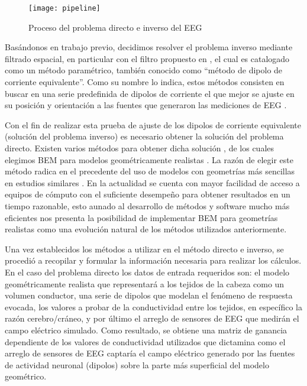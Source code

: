 \begin{figure}[tb]
	\centering
	\texttt{[image: pipeline]}
	\caption{Proceso del problema directo e inverso del EEG
		}
	\label{fig:methodology:pipeline}
\end{figure}

Basándonos en trabajo previo, decidimos resolver el problema inverso mediante filtrado espacial, en particular con el filtro propuesto en \cite{VanVeen1988}, el cual es catalogado como un método paramétrico, también conocido como ``método de dipolo de corriente equivalente''.
Como su nombre lo indica, estos métodos consisten en buscar en una serie predefinida de dipolos de corriente el que mejor se ajuste en su posición y orientación a las fuentes que generaron las mediciones de EEG  \cite{Hallez2007}.

Con el fin de realizar esta prueba de ajuste de los dipolos de corriente equivalente (solución del problema inverso) es necesario obtener la solución del problema directo. Existen varios métodos para obtener dicha solución \cite{Mosher1999}, de los cuales elegimos BEM para modelos geométricamente realistas \cite{Ermer2001}.
La razón de elegir este método radica en el precedente del uso de modelos con geometrías más sencillas en estudios similares \cite{Gutierrez2004}.
En la actualidad se cuenta con mayor facilidad de acceso a equipos de cómputo con el suficiente desempeño para obtener resultados en un tiempo razonable, esto aunado al desarrollo de métodos y software mucho más eficientes \cite{open,Clerc2010} nos presenta la posibilidad de implementar BEM para geometrías realistas como una evolución natural de los métodos utilizados anteriormente.

Una vez establecidos los métodos a utilizar en el método directo e inverso, se procedió a recopilar y formular la información necesaria para realizar los cálculos.
En el caso del problema directo los datos de entrada requeridos son: el modelo geométricamente realista que representará a los tejidos de la cabeza como un volumen conductor, una serie de dipolos que modelan el fenómeno de respuesta evocada, los valores a probar de la conductividad entre los tejidos, en específico la razón cerebro/cráneo, y por último el arreglo de sensores de EEG que medirán el campo eléctrico simulado.
Como resultado, se obtiene una matriz de ganancia dependiente de los valores de conductividad utilizados que dictamina como el arreglo de sensores de EEG captaría el campo eléctrico generado por las fuentes de actividad neuronal (dipolos) sobre la parte más superficial del modelo geométrico.

